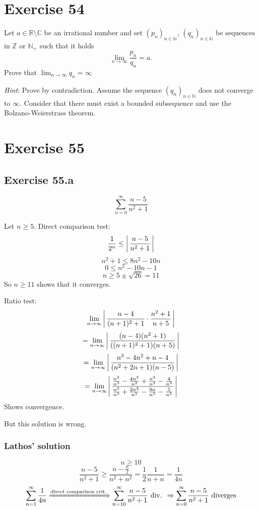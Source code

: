 \documentclass[a4paper]{article}
\theoremstyle{definition}
\newcommand\abs[1]{\left|\thinspace #1\thinspace\right|}
\newcommand\seq[1]{\left(#1\right)_{n\in\mathbb N}}
\begin{document}
\section{Exercise 54}
\begin{ex}
  Let $a \in \mathbb R \setminus \mathbb C$ be an irrational number and set $\seq{p_n}$, $\seq{q_n}$ be sequences in $\mathbb Z$ or $\mathbb N_+$ such that it holds
  \[ \lim_{n\to\infty} \frac{p_n}{q_n} = a. \]
  Prove that $\lim_{n\to\infty} q_n = \infty$

  \emph{Hint}: Prove by contradiction. Assume the sequence $\seq{q_n}$ does not converge to $\infty$.
  Consider that there must exist a bounded subsequence and use the Bolzano-Weierstrass theorem.
\end{ex}

\section{Exercise 55}
%
\subsection{Exercise 55.a}
\[ \sum_{n=0}^\infty \frac{n-5}{n^2 + 1} \]

Let $n \geq 5$. Direct comparison test:
\[ \frac{1}{2^n} \leq \abs{\frac{n-5}{n^2+1}} \]
\[ n^2 + 1 \leq 8n^2 - 10n \]
\[ 0 \leq n^2 - 10n - 1 \]
\[ n \geq 5 \pm \sqrt{26} = 11 \]
So $n \geq 11$ shows that it converges.

Ratio test:
\[ \lim_{n\to\infty} \abs{\frac{n-4}{(n+1)^2 + 1} \cdot \frac{n^2+1}{n+5}} \]
\[ = \lim_{n\to\infty} \abs{\frac{(n-4)(n^2+1)}{((n+1)^2 + 1)(n+5)}} \]
\[ = \lim_{n\to\infty} \abs{\frac{n^3 - 4n^2 + n - 4}{(n^2+2n+1)(n-5)}} \]
\[ = \lim_{n\to\infty} \abs{\frac{\frac{n^3}{n^3} - \frac{4n^2}{n^2} + \frac{n^3}{n^3} - \frac{4}{n^3}}{\frac{n^3}{n^3} + \frac{2n^2}{n^3} - \frac{9n}{n^3} - \frac{5}{n^3}}} \]
Shows convergence.

But this solution is wrong.

\subsubsection{Lathos' solution}
\[ n \geq 10 \]
\[ \frac{n-5}{n^2+1} \geq \frac{n-\frac{n}{2}}{n^2+n^2} = \frac12 \frac{1}{n+n} = \frac1{4n} \]
\[
  \sum_{n=1}^\infty \frac{1}{4n}
  \xRightarrow{\text{direct comparison crit.}} \sum_{n=10}^\infty \frac{n-5}{n^2+1} \text{ div. }
  \Rightarrow \sum_{n=0}^\infty \frac{n-5}{n^2+1} \text{ diverges}
\]
\end{document}
